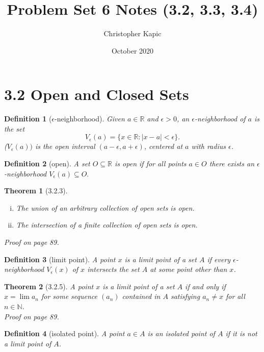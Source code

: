 \documentclass{article}
\title{Problem Set 6 Notes (3.2, 3.3, 3.4)}
\author{Christopher Kapic}
\date{October 2020}
\newtheorem{definition}{Definition}
\newtheorem{thm}{Theorem}
\begin{document}
\maketitle

\section*{3.2 Open and Closed Sets}
\begin{definition}[$\epsilon$-neighborhood]
    Given $a \in \mathbb{R}$ and $\epsilon > 0$, an $\epsilon$-neighborhood of $a$ is the set \[V_\epsilon (a) = \{x \in \mathbb{R} : |x-a| < \epsilon\}.\]
    ($V_\epsilon (a))$ is the open interval $(a-\epsilon, a + \epsilon)$, centered at $a$ with radius $\epsilon$. 
\end{definition}

\begin{definition}[open]
    A set $O \subseteq \mathbb{R}$ is open if for all points $a \in O$ there exists an $\epsilon$-neighborhood $V_\epsilon (a) \subseteq O.$
\end{definition}

\begin{thm}[3.2.3]
    \begin{enumerate}[(i)]
        \item The union of an arbitrary collection of open sets is open.
        \item The intersection of a finite collection of open sets is open.
    \end{enumerate}
    Proof on page 89.
\end{thm}

\begin{definition}[limit point]
    A point $x$ is a limit point of a set $A$ if every $\epsilon$-neighborhood $V_\epsilon (x)$ of $x$ intersects the set $A$ at some point other than $x$.
\end{definition}

\begin{thm}[3.2.5]
    A point $x$ is a limit point of a set $A$ if and only if $x = \lim a_n$ for some sequence $(a_n)$ contained in $A$ satisfying $a_n \neq x$ for all $n \in \mathbb{N}$. \\ Proof on page 89.
\end{thm}

\begin{definition}[isolated point]
    A point $a \in A$ is an isolated point of $A$ if it is not a limit point of $A$.
\end{definition}
\end{document}

